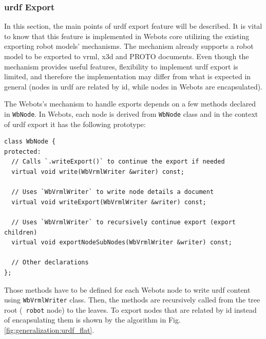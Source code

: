 \subsubsection{\ac{urdf} Export}
\label{subsub:generalization:urdf_export}

In this section, the main points of \ac{urdf} export feature will be described.
It is vital to know that this feature is implemented in Webots core utilizing the existing exporting robot models' mechanisms.
The mechanism already supports a robot model to be exported to \acs{vrml}, \acs{x3d} and PROTO documents.
Even though the mechanism provides useful features, flexibility to implement \ac{urdf} export is limited, and therefore the implementation may differ from what is expected in general (nodes in \ac{urdf} are related by \acs{id}, while nodes in Webots are encapsulated).

The Webots's mechanism to handle exports depends on a few methods declared in \texttt{WbNode}.
In Webots, each node is derived from \texttt{WbNode} class and in the context of \ac{urdf} export it has the following prototype:
\begin{verbatim}
class WbNode {
protected:
  // Calls `.writeExport()` to continue the export if needed
  virtual void write(WbVrmlWriter &writer) const;

  // Uses `WbVrmlWriter` to write node details a document
  virtual void writeExport(WbVrmlWriter &writer) const;
  
  // Uses `WbVrmlWriter` to recursively continue export (export children)
  virtual void exportNodeSubNodes(WbVrmlWriter &writer) const;
  
  // Other declarations
};
\end{verbatim}

Those methods have to be defined for each Webots node to write \ac{urdf} content using \texttt{WbVrmlWriter} class.
Then, the methods are recursively called from the tree root (\texttt{ robot} node) to the leaves.
To export nodes that are related by \acs{id} instead of encapsulating them is shown by the algorithm in Fig. \ref{fig:generalization:urdf_flat}.

